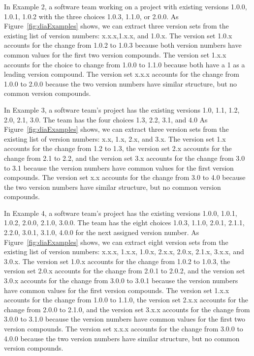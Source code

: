 \documentclass[conference]{IEEEtran}
\begin{document}
In Example 2, a software team working on a project with existing versions 1.0.0, 1.0.1, 1.0.2 with the three choices 1.0.3, 1.1.0, or 2.0.0. 
As Figure~\ref{fig:diaExamples} shows, we can extract three version sets from the existing list of version numbers: x.x.x,1.x.x, and 1.0.x. 
The version set 1.0.x accounts for the change from 1.0.2 to 1.0.3 because both version numbers have common values for the first two version compounds. 
The version set 1.x.x accounts for the choice to change from 1.0.0 to 1.1.0 because both have a 1 as a leading version compound. 
The version set x.x.x accounts for the change from 1.0.0 to 2.0.0 because the two version numbers have similar structure, but no common version compounds.



In Example 3, a software team's project has the existing versions 1.0, 1.1, 1.2, 2.0, 2.1, 3.0. The team has the four choices 1.3, 2.2, 3.1, and 4.0 
As Figure~\ref{fig:diaExamples} shows, we can extract three version sets from the existing list of version numbers: x.x, 1.x, 2.x, and 3.x. 
The version set 1.x accounts for the change from 1.2 to 1.3, the version set 2.x accounts for the change from 2.1 to 2.2, and the version set 3.x accounts for the change from 3.0 to 3.1 because the version numbers have common values for the first version compounds. 
The version set x.x accounts for the change from 3.0 to 4.0 because the two version numbers have similar structure, but no common version compounds.


In Example 4, a software team's project has the existing versions 1.0.0, 1.0.1, 1.0.2, 2.0.0, 2.1.0, 3.0.0.
 The team has the eight choices 1.0.3, 1.1.0, 2.0.1, 2.1.1, 2.2.0, 3.0.1, 3.1.0, 4.0.0 for the next assigned version number. 
As Figure~\ref{fig:diaExamples} shows, we can extract eight version sets from the existing list of version numbers: x.x.x, 1.x.x, 1.0.x, 2.x.x, 2.0.x, 2.1.x, 3.x.x, and 3.0.x. 
The version set 1.0.x accounts for the change from 1.0.2 to 1.0.3, the version set 2.0.x accounts for the change from 2.0.1 to 2.0.2, and the version set 3.0.x accounts for the change from 3.0.0 to 3.0.1 because the version numbers have common values for the first version compounds. 
The version set 1.x.x accounts for the change from 1.0.0 to 1.1.0, the version set 2.x.x accounts for the change from 2.0.0 to 2.1.0, and the version set 3.x.x accounts for the change from 3.0.0 to 3.1.0 because the version numbers have common values for the first two version compounds. 
The version set x.x.x accounts for the change from 3.0.0 to 4.0.0 because the two version numbers have similar structure, but no common version compounds.
\end{document}
